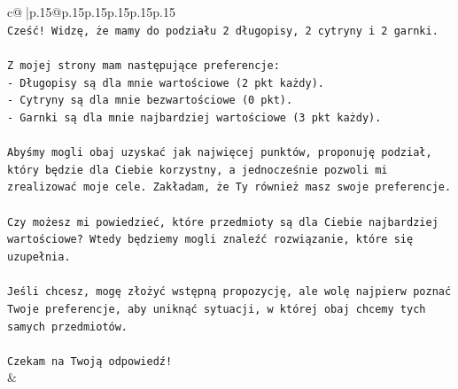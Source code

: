 \documentclass{article}
\begin{document}
{\begin{supertabular}{c@{$\;$}|p{.15\linewidth}@{}p{.15\linewidth}p{.15\linewidth}p{.15\linewidth}p{.15\linewidth}p{.15\linewidth}}
{{{\\ 
\texttt{Cześć! Widzę, że mamy do podziału 2 długopisy, 2 cytryny i 2 garnki.} \\
\\ 
\texttt{Z mojej strony mam następujące preferencje:} \\
\texttt{{-} Długopisy są dla mnie wartościowe (2 pkt każdy).} \\
\texttt{{-} Cytryny są dla mnie bezwartościowe (0 pkt).} \\
\texttt{{-} Garnki są dla mnie najbardziej wartościowe (3 pkt każdy).} \\
\\ 
\texttt{Abyśmy mogli obaj uzyskać jak najwięcej punktów, proponuję podział, który będzie dla Ciebie korzystny, a jednocześnie pozwoli mi zrealizować moje cele. Zakładam, że Ty również masz swoje preferencje.} \\
\\ 
\texttt{Czy możesz mi powiedzieć, które przedmioty są dla Ciebie najbardziej wartościowe? Wtedy będziemy mogli znaleźć rozwiązanie, które się uzupełnia.} \\
\\ 
\texttt{Jeśli chcesz, mogę złożyć wstępną propozycję, ale wolę najpierw poznać Twoje preferencje, aby uniknąć sytuacji, w której obaj chcemy tych samych przedmiotów.} \\
\\ 
\texttt{Czekam na Twoją odpowiedź!} \\
            }
        }
    }
    & \\ \\


\end{supertabular}}
\end{document}
